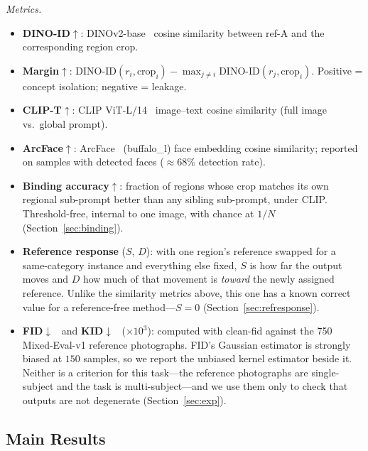 \documentclass[10pt,twocolumn,letterpaper]{article}
\begin{document}
\noindent\textit{Metrics.}
\begin{itemize}\setlength\itemsep{2pt}
\item \textbf{DINO-ID}$\uparrow$: DINOv2-base~\cite{oquab2024dinov2}
      cosine similarity between ref-A and the corresponding region crop.
\item \textbf{Margin}$\uparrow$:
      $\mathrm{DINO\text{-}ID}(r_i,\mathrm{crop}_i)
       -\max_{j\neq i}\mathrm{DINO\text{-}ID}(r_j,\mathrm{crop}_i)$.
      Positive = concept isolation; negative = leakage.
\item \textbf{CLIP-T}$\uparrow$: CLIP ViT-L/14~\cite{radford2021learning}
      image–text cosine similarity (full image vs.\ global prompt).
\item \textbf{ArcFace}$\uparrow$: ArcFace~\cite{deng2019arcface}
      (buffalo\_l) face embedding
      cosine similarity; reported on samples with detected faces
      (${\approx}68\%$ detection rate).
\item \textbf{Binding accuracy}$\uparrow$: fraction of regions whose crop
      matches its own regional sub-prompt better than any sibling
      sub-prompt, under CLIP.  Threshold-free, internal to one image, with
      chance at $1/N$ (Section~\ref{sec:binding}).
\item \textbf{Reference response} ($S$, $D$): with one region's reference
      swapped for a same-category instance and everything else fixed, $S$ is
      how far the output moves and $D$ how much of that movement is
      \emph{toward} the newly assigned reference.  Unlike the similarity
      metrics above, this one has a known correct value for a
      reference-free method---$S{=}0$ (Section~\ref{sec:refresponse}).
\item \textbf{FID}$\downarrow$~\cite{heusel2017gans} and
      \textbf{KID}$\downarrow$~\cite{binkowski2018demystifying}
      ($\times 10^{3}$): computed with clean-fid against the 750
      Mixed-Eval-v1 reference photographs.  FID's Gaussian estimator is
      strongly biased at $150$ samples, so we report the unbiased kernel
      estimator beside it.  Neither is a criterion for this task---the
      reference photographs are single-subject and the task is
      multi-subject---and we use them only to check that outputs are not
      degenerate (Section~\ref{sec:exp}).
\end{itemize}

\subsection{Main Results}
\label{sec:main_results}
\end{document}
